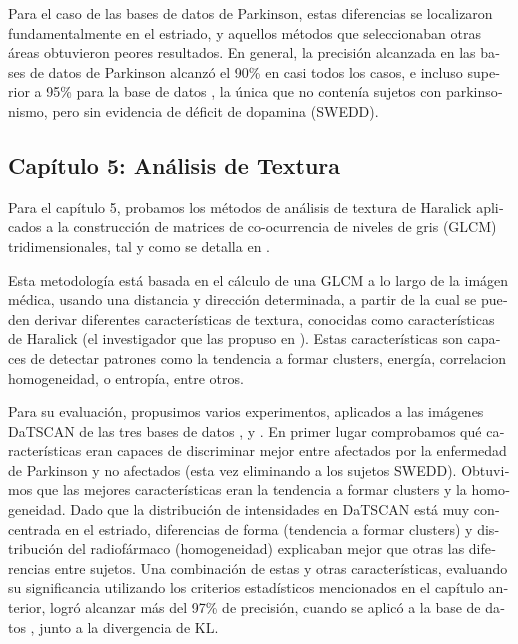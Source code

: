 \begin{otherlanguage}{spanish}
Para el caso de las bases de datos de Parkinson, estas diferencias se localizaron fundamentalmente en el estriado, y aquellos métodos que seleccionaban otras áreas obtuvieron peores resultados. En general, la precisión alcanzada en las bases de datos de Parkinson alcanzó el 90\% en casi todos los casos, e incluso superior a 95\% para la base de datos \vdlvdat{}, la única que no contenía sujetos con parkinsonismo, pero sin evidencia de déficit de dopamina (\acs{SWEDD}). 


\subsection*{Capítulo 5: Análisis de Textura}
Para el capítulo 5, probamos los métodos de análisis de textura de Haralick aplicados a la construcción de matrices de co-ocurrencia de niveles de gris (\acs{GLCM}) tridimensionales, tal y como se detalla en \cite{Martinez-Murcia2013266,martinez2014parametrization}. 

Esta metodología está basada en el cálculo de una \acs{GLCM} a lo largo de la imágen médica, usando una distancia y dirección determinada, a partir de la cual se pueden derivar diferentes características de textura, conocidas como características de Haralick (el investigador que las propuso en \cite{Haralick73}). Estas características son capaces de detectar patrones como la tendencia a formar clusters, energía, correlacion homogeneidad, o entropía, entre otros. 

Para su evaluación, propusimos varios experimentos, aplicados a las imágenes DaTSCAN de las tres bases de datos \vdlndat{}, \vdlvdat{} y \ppmidat{}. En primer lugar comprobamos qué características eran capaces de discriminar mejor entre afectados por la enfermedad de Parkinson y no afectados (esta vez eliminando a los sujetos \acs{SWEDD}). Obtuvimos que las mejores características eran la tendencia a formar clusters y la homogeneidad. Dado que la distribución de intensidades en DaTSCAN está muy concentrada en el estriado, diferencias de forma (tendencia a formar clusters) y distribución del radiofármaco (homogeneidad) explicaban mejor que otras las diferencias entre sujetos. Una combinación de estas y otras características, evaluando su significancia utilizando los criterios estadísticos mencionados en el capítulo anterior, logró alcanzar más del 97\% de precisión, cuando se aplicó a la base de datos \ppmidat{}, junto a la divergencia de \acs{KL}.


\end{otherlanguage}
